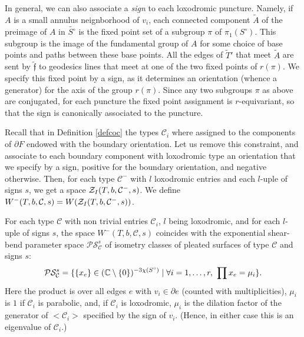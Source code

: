 In general, we can also associate a {\it sign} to each loxodromic
puncture. Namely, if $A$ is a small annulus neignborhood of $v_i$,
each connected component $\tilde{A}$ of the preimage of $A$ in
$\tilde{S^{\circ}}$ is the fixed point set of a subgroup $\pi$ of
$\pi_1(S^{\circ})$. This subgroup is the image of the fundamental
group of $A$ for some choice of base points and paths between
these base points. All the edges of $\tilde{T}'$ that meet
$\tilde{A}$ are sent by $\tilde{\mathfrak{f}}$ to geodesics lines
that meet at one of the two fixed points of $r(\pi)$. We specify
this fixed point by a sign, as it determines an orientation
(whence a generator) for the axis of the group $r(\pi)$. Since any
two subgroups $\pi$ as above are conjugated, for each puncture the
fixed point assignment is $r$-equivariant, so that the sign is
canonically associated to the puncture.

\smallskip

Recall that in Definition \ref{defcoc} the types $\mathcal{C}_i$
where assigned to the components of $\partial F$ endowed with the
boundary orientation. Let us remove this constraint, and associate
to each boundary component with loxodromic type an orientation
that we specify by a sign, positive for the boundary orientation,
and negative otherwise. Then, for each type $\mathcal{C}^-$ with
$l$ loxodromic entries and each $l$-uple of signs $s$, we get a
space ${\mathcal Z}_I(T,b,\mathcal{C}^-,s)$. We define
$W^-(T,b,\mathcal{C},s)=W({\mathcal Z}_I(T,b,\mathcal{C}^-,s))$.
\begin{prop}\label{psI}{\rm For each type
    $\mathcal{C}$ with non trivial entries $\mathcal{C}_i$, $l$ being
    loxodromic, and for each $l$-uple of signs $s$, the space
    $W^-(T,b,\mathcal{C},s)$ coincides with the exponential shear-bend
    parameter space $\mathcal{P}\mathcal{S}_{\mathcal{C}}^s$ of
    isometry classes of pleated surfaces of type $\mathcal{C}$ and
    signs $s$:
\begin{equation}\label{polPS}
\mathcal{P}\mathcal{S}_{\mathcal{C}}^s = \lbrace \{x_e\} \in (\mathbb{C}
  \setminus \{ 0 \})^{-3\chi(S^{\circ})} \mid \forall i=1,\ldots,r,\
  \prod x_e = \mu_i \rbrace.
\end{equation}
Here the product is over all edges $e$ with $v_i \in\partial e$
(counted with multiplicities), $\mu_i$ is $1$ if $\mathcal{C}_i$
is parabolic, and, if $\mathcal{C}_i$ is loxodromic, $\mu_i$ is
the dilation factor of the generator of $<\mathcal{C}_i>$
specified by the sign of $v_i$. (Hence, in either case this is an
eigenvalue of $\mathcal{C}_i$.)}
\end{prop}

